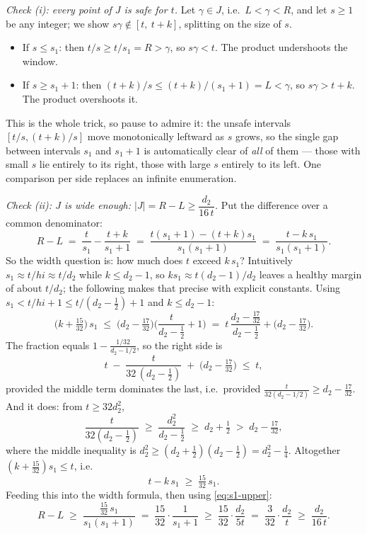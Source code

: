 \documentclass[11pt,reqno]{amsart}
\theoremstyle{plain}
\theoremstyle{definition}
\theoremstyle{remark}
\begin{document}
\medskip
\emph{Check (i): every point of $J$ is safe for $t$.} Let $\gamma \in J$, i.e.\
$L < \gamma < R$, and let $s \ge 1$ be any integer; we show
$s\gamma \notin [t,\ t+k]$, splitting on the size of $s$.
\begin{itemize}
\item If $s \le s_1$: then $t/s \ge t/s_1 = R > \gamma$, so $s\gamma < t$. The
      product undershoots the window.
\item If $s \ge s_1 + 1$: then $(t+k)/s \le (t+k)/(s_1+1) = L < \gamma$, so
      $s\gamma > t + k$. The product overshoots it.
\end{itemize}
This is the whole trick, so pause to admire it: the unsafe intervals
$[t/s, (t+k)/s]$ move monotonically leftward as $s$ grows, so the single gap between
intervals $s_1$ and $s_1{+}1$ is automatically clear of \emph{all} of them --- those
with small $s$ lie entirely to its right, those with large $s$ entirely to its left.
One comparison per side replaces an infinite enumeration.

\medskip
\emph{Check (ii): $J$ is wide enough: $|J| = R - L \ge \dfrac{d_2}{16\,t}$.} Put the
difference over a common denominator:
\[
  R - L \;=\; \frac{t}{s_1} - \frac{t+k}{s_1+1}
        \;=\; \frac{t(s_1+1) - (t+k)s_1}{s_1(s_1+1)}
        \;=\; \frac{t - k\,s_1}{s_1(s_1+1)} .
\]
So the width question is: how much does $t$ exceed $k\,s_1$? Intuitively $s_1
\approx t/hi \approx t/d_2$ while $k \le d_2 - 1$, so $k s_1 \approx t(d_2-1)/d_2$
leaves a healthy margin of about $t/d_2$; the following makes that precise with
explicit constants. Using $s_1 < t/hi + 1 \le t/(d_2 - \frac12) + 1$ and $k \le d_2 -
1$:
\[
  \Big(k + \tfrac{15}{32}\Big)\, s_1
  \;\le\; \Big(d_2 - \tfrac{17}{32}\Big) \Big( \frac{t}{d_2 - \tfrac12} + 1 \Big)
  \;=\; t\,\frac{d_2 - \tfrac{17}{32}}{d_2 - \tfrac12} + \Big(d_2 - \tfrac{17}{32}\Big) .
\]
The fraction equals $1 - \frac{1/32}{d_2 - 1/2}$, so the right side is
\[
  t \;-\; \frac{t}{32\,(d_2 - \tfrac12)} \;+\; \Big(d_2 - \tfrac{17}{32}\Big)
  \;\le\; t ,
\]
provided the middle term dominates the last, i.e.\ provided
$\frac{t}{32(d_2 - 1/2)} \ge d_2 - \frac{17}{32}$. And it does: from
$t \ge 32 d_2^2$,
\[
  \frac{t}{32(d_2 - \tfrac12)} \;\ge\; \frac{d_2^2}{d_2 - \tfrac12}
  \;\ge\; d_2 + \tfrac12 \;>\; d_2 - \tfrac{17}{32},
\]
where the middle inequality is $d_2^2 \ge (d_2 + \tfrac12)(d_2 - \tfrac12) = d_2^2 -
\tfrac14$. Altogether $(k + \tfrac{15}{32}) s_1 \le t$, i.e.
\[
  t - k\,s_1 \;\ge\; \tfrac{15}{32}\, s_1 .
\]
Feeding this into the width formula, then using \eqref{eq:s1-upper}:
\[
  R - L \;\ge\; \frac{\tfrac{15}{32}\,s_1}{s_1(s_1+1)} \;=\; \frac{15}{32}\cdot\frac{1}{s_1+1}
        \;\ge\; \frac{15}{32}\cdot\frac{d_2}{5t} \;=\; \frac{3}{32}\cdot\frac{d_2}{t}
        \;\ge\; \frac{d_2}{16\,t} .
\]
\end{document}

